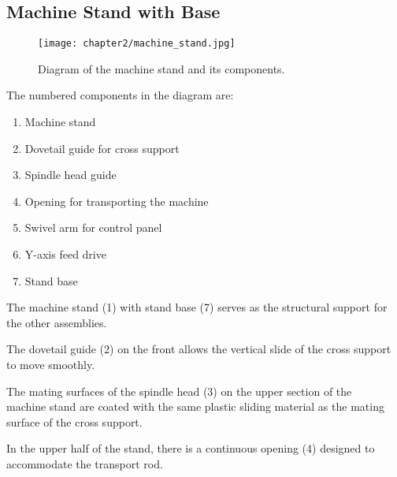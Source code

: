 

\subsection{Machine Stand with Base}

\begin{figure}[h]
    \centering
    \texttt{[image: chapter2/machine\_stand.jpg]}
    \caption{Diagram of the machine stand and its components.}
    \label{fig:machine_stand}
\end{figure}

\noindent The numbered components in the diagram are:
\begin{enumerate}[itemsep=1pt,parsep=0pt]
    \item Machine stand
    \item Dovetail guide for cross support
    \item Spindle head guide
    \item Opening for transporting the machine
    \item Swivel arm for control panel
    \item Y-axis feed drive
    \item Stand base
\end{enumerate}

\noindent The machine stand (1) with stand base (7) serves as the structural support for the other assemblies.

\vspace{.3cm}

\noindent The dovetail guide (2) on the front allows the vertical slide of the cross support to move smoothly.

\vspace{.3cm}

\noindent The mating surfaces of the spindle head (3) on the upper section of the \\machine stand are coated with the same plastic sliding material as the mating surface of the cross support.

\vspace{.3cm}

\noindent In the upper half of the stand, there is a continuous opening (4) designed to accommodate the transport rod.

\vspace{.3cm}

